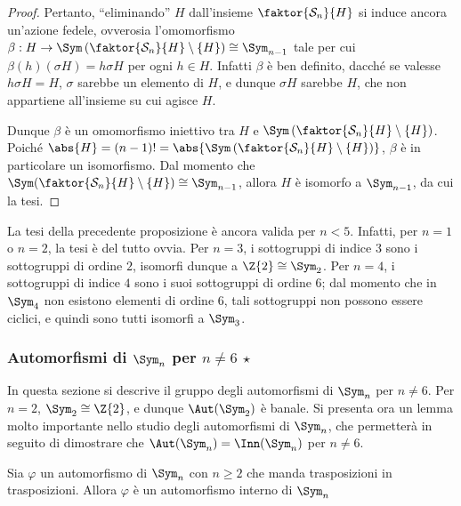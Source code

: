 \documentclass[11pt]{scrartcl}
\begin{document}
\begin{proof}
		
		Pertanto, ``eliminando'' $H$
		dall'insieme $\faktor{\mathcal{S}_n}{H}$ si induce ancora un'azione fedele, ovverosia
		l'omomorfismo $\beta : H \to \Sym\left(\faktor{\mathcal{S}_n}{H} \setminus \{H\}\right) \cong \Sym_{n-1}$
		tale per cui $\beta(h)(\sigma H) = h \sigma H$ per ogni $h \in H$. Infatti $\beta$ è ben definito,
		dacché se valesse $h \sigma H = H$, $\sigma$ sarebbe un elemento di $H$, e dunque $\sigma H$ sarebbe
		$H$, che non appartiene all'insieme su cui agisce $H$. \medskip
		
		
		Dunque $\beta$ è un omomorfismo iniettivo tra $H$ e $\Sym\left(\faktor{\mathcal{S}_n}{H} \setminus \{H\}\right)$. Poiché $\abs{H} = (n-1)! = \abs{\Sym\left(\faktor{\mathcal{S}_n}{H} \setminus \{H\}\right)}$, $\beta$ è in particolare un isomorfismo. 
		Dal momento che $\Sym(\faktor{\mathcal{S}_n}{H} \setminus \{H\}) \cong
		\Sym_{n-1}$, allora $H$ è isomorfo a $\Sym_{n-1}$, da cui la tesi.
	\end{proof}
	
	\begin{remark}
		La tesi della precedente proposizione è ancora valida per $n < 5$. Infatti, per $n = 1$
		o $n = 2$, la tesi è del tutto ovvia. Per $n = 3$, i sottogruppi di indice $3$ sono
		i sottogruppi di ordine $2$, isomorfi dunque a $\Z{2} \cong \Sym_2$. Per $n = 4$, i
		sottogruppi di indice $4$ sono i suoi sottogruppi di ordine $6$; dal momento che in $\Sym_4$ non
		esistono elementi di ordine $6$, tali sottogruppi non possono essere ciclici, e quindi sono
		tutti isomorfi a $\Sym_3$.
	\end{remark}
	
	\subsubsection{Automorfismi di $\Sym_n$ per \texorpdfstring{$n \neq 6$}{n≠6} \texorpdfstring{$\star$}{★}}
	
	
	In questa sezione si descrive il gruppo degli automorfismi di $\Sym_n$ per $n \neq 6$.
	Per $n = 2$, $\Sym_2 \cong \Z{2}$, e dunque $\Aut(\Sym_2)$ è banale. Si presenta
	ora un lemma molto importante nello studio degli automorfismi di $\Sym_n$, che permetterà
	in seguito di dimostrare che $\Aut(\Sym_n) = \Inn(\Sym_n)$ per $n \neq 6$.
	
	\begin{lemma}
		\label{lemma:trasp_in_trasp}
		Sia $\varphi$ un automorfismo di $\Sym_n$ con $n \geq 2$ che manda trasposizioni in trasposizioni.
		Allora $\varphi$ è un automorfismo interno di $\Sym_n$
	\end{lemma}
	
\end{document}
